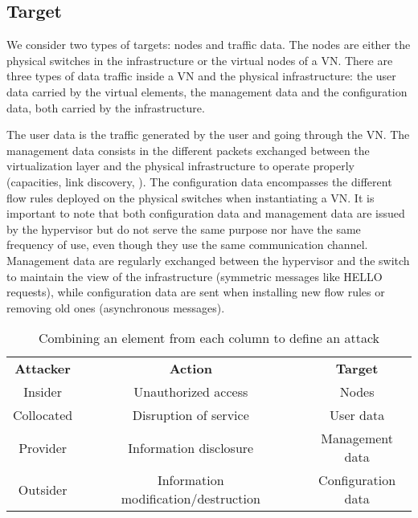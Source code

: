\subsection{Target}
We consider two types of targets: nodes and traffic data.
The nodes are either the physical switches in the infrastructure or the virtual nodes of a VN.
There are three types of data traffic inside a VN and the physical infrastructure:
the user data carried by the virtual elements, the management data and the configuration data, both carried by the infrastructure. 

The user data is the traffic generated by the user and going through the VN.
The management data consists in the different packets exchanged between the virtualization layer and the physical infrastructure to operate properly (capacities, link discovery, \etc).
The configuration data encompasses the different flow rules deployed on the physical switches when instantiating a VN.
It is important to note that both configuration data and management data are issued by the hypervisor but do not serve the same purpose nor have the same frequency of use, even though they use the same communication channel.
Management data are regularly exchanged between the hypervisor and the switch to maintain the view of the infrastructure (\eg symmetric messages like HELLO requests), while configuration data are sent when installing new flow rules or removing old ones (\eg asynchronous messages).

\begin{table}[ht]
\centering
\begin{tabular}{|c|c|c|c|c|}
\cline{1-1} \cline{3-3} \cline{5-5}
\textbf{Attacker} &  & \textbf{Action}                      &  & \textbf{Target}    \\ \cline{1-1} \cline{3-3} \cline{5-5} 
Insider           &  & Unauthorized access                  &  & Nodes              \\ \cline{1-1} \cline{3-3} \cline{5-5} 
Collocated        &  & Disruption of service                &  & User data          \\ \cline{1-1} \cline{3-3} \cline{5-5} 
Provider          &  & Information disclosure               &  & Management data    \\ \cline{1-1} \cline{3-3} \cline{5-5} 
Outsider          &  & Information modification/destruction &  & Configuration data \\ \cline{1-1} \cline{3-3} \cline{5-5} 
\end{tabular}%
\caption{Combining an element from each column to define an attack}
\label{tab:attack-model}
\end{table}


